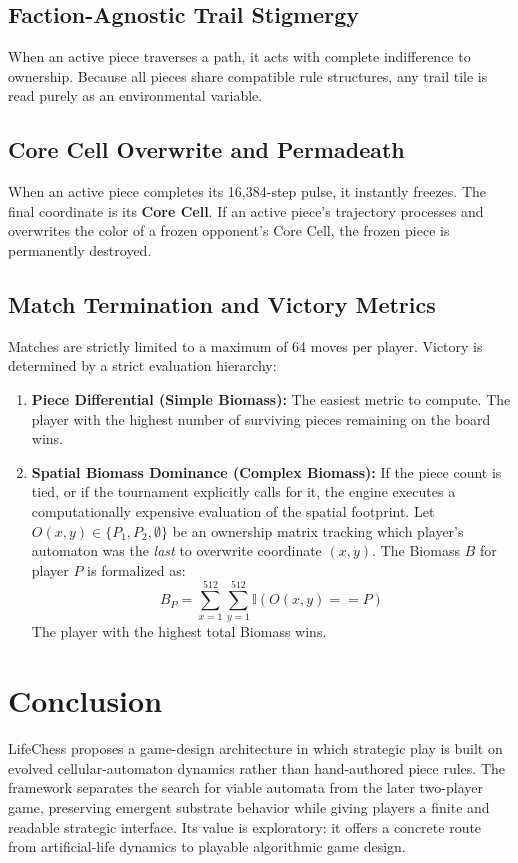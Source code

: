\documentclass[11pt]{article}
\begin{document}
	\subsection{Faction-Agnostic Trail Stigmergy}
	When an active piece traverses a path, it acts with complete indifference to ownership. %
	Because all pieces share compatible rule structures, any trail tile is read purely as an environmental variable. %
	
	\subsection{Core Cell Overwrite and Permadeath}
	When an active piece completes its 16,384-step pulse, it instantly freezes. %
	The final coordinate is its \textbf{Core Cell}. %
	If an active piece's trajectory processes and overwrites the color of a frozen opponent's Core Cell, the frozen piece is permanently destroyed. %
	
	\subsection{Match Termination and Victory Metrics}
	Matches are strictly limited to a maximum of 64 moves per player. %
	Victory is determined by a strict evaluation hierarchy:
	
	\begin{enumerate}
		\item \textbf{Piece Differential (Simple Biomass):} The easiest metric to compute. The player with the highest number of surviving pieces remaining on the board wins. %
		\item \textbf{Spatial Biomass Dominance (Complex Biomass):} If the piece count is tied, or if the tournament explicitly calls for it, the engine executes a computationally expensive evaluation of the spatial footprint. %
		Let $O(x,y) \in \{P_1, P_2, \emptyset\}$ be an ownership matrix tracking which player's automaton was the \textit{last} to overwrite coordinate $(x,y)$. %
		The Biomass $B$ for player $P$ is formalized as:
		\begin{equation}
			B_P = \sum_{x=1}^{512} \sum_{y=1}^{512} \mathbb{I}(O(x,y) == P)
		\end{equation}
		The player with the highest total Biomass wins. %
	\end{enumerate}

	\section{Conclusion}

	LifeChess proposes a game-design architecture in which strategic play is
	built on evolved cellular-automaton dynamics rather than hand-authored piece
	rules. The framework separates the search for viable automata from the later
	two-player game, preserving emergent substrate behavior while giving players
	a finite and readable strategic interface. Its value is exploratory: it
	offers a concrete route from artificial-life dynamics to playable
	algorithmic game design.
	
\end{document}
